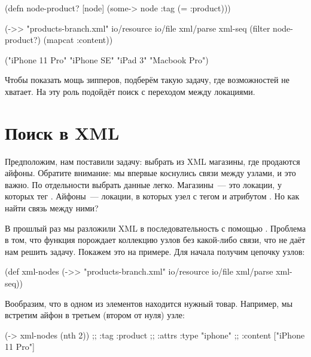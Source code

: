 \begin{english}
  \begin{clojure}
(defn node-product? [node]
  (some-> node :tag (= :product)))

(->> "products-branch.xml"
     io/resource
     io/file
     xml/parse
     xml-seq
     (filter node-product?)
     (mapcat :content))

("iPhone 11 Pro" "iPhone SE" "iPad 3" "Macbook Pro")
  \end{clojure}
\end{english}

Чтобы показать мощь зипперов, подберём такую задачу, где возможностей 
не хватает. На эту роль подойдёт поиск с переходом между локациями.

\section{Поиск в XML}

Предположим, нам поставили задачу: выбрать из XML магазины, где продаются
айфоны. Обратите внимание: мы впервые коснулись связи между узлами, и это
важно. По отдельности выбрать данные легко. Магазины~--- это локации, у которых
тег . Айфоны~--- локации, в которых узел с тегом  и
атрибутом . Но как найти связь между ними?

В прошлый раз мы разложили XML в последовательность с помощью
. Проблема в том, что функция порождает коллекцию узлов без какой-либо
связи, что не даёт нам решить задачу. Покажем это на примере. Для начала получим
цепочку узлов:

\begin{english}
  \begin{clojure}
(def xml-nodes
  (->> "products-branch.xml"
       io/resource
       io/file
       xml/parse
       xml-seq))
  \end{clojure}
\end{english}

Вообразим, что в одном из элементов находится нужный товар. Например, мы
встретим айфон в третьем (втором от нуля) узле:

\begin{english}
  \begin{clojure}
(-> xml-nodes (nth 2))
;; {:tag :product
;;  :attrs {:type "iphone"}
;;  :content ["iPhone 11 Pro"]}
  \end{clojure}
\end{english}

